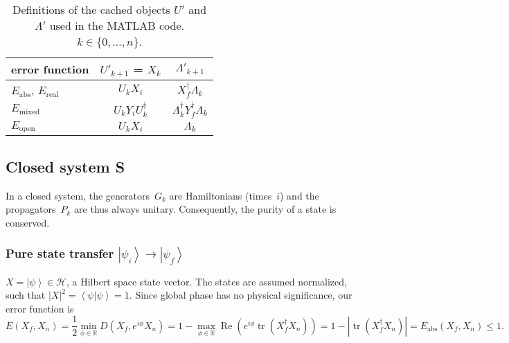 \documentclass[aps, pra, a4paper, longbibliography]{revtex4}
\newcommand{\be}{\begin{equation}}
\newcommand{\ee}{\end{equation}}
\newcommand{\R}{{\mathbb R}}  %
\newcommand{\ket}[1]{\left| #1 \right \rangle}
\newcommand{\bra}[1]{\left \langle #1 \right|}
\newcommand{\braket}[2]{\left \langle #1 | #2 \right \rangle}
\newcommand{\ketbra}[2]{\left| #1 \right \rangle \left \langle #2 \right|}
\newcommand{\hilb}[1]{\mathcal{#1}}
\DeclareMathOperator{\tr}{tr}
\DeclareMathOperator{\re}{Re}
\DeclareMathOperator{\cvec}{vec}
\begin{document}
\begin{table}
\begin{tabular}{l|c|c}
error function & $U'_{k+1}$ = $X_k$ & $\Lambda'_{k+1}$\\
\hline
$E_\text{abs}$, $E_\text{real}$ & $U_k X_i$ & $X_f^\dagger \Lambda_k$\\
$E_\text{mixed}$ & $U_k Y_i U_k^\dagger$ & $\Lambda_k^\dagger Y_f^\dagger \Lambda_k$\\
$E_\text{open}$ & $U_k X_i$ & $\Lambda_k$
\end{tabular}
\caption{Definitions of the cached objects $U'$ and $\Lambda'$ used in the MATLAB
  code. $k \in \{0, \ldots, n\}$.}
\label{table:UL}
\end{table}


\subsection{Closed system S}

In a closed system, the generators~$G_k$ are Hamiltonians (times~$i$)
and the propagators~$P_k$ are thus always
unitary. Consequently, the purity of a state is conserved.


\subsubsection{Pure state transfer $\ket{\psi_i} \to \ket{\psi_f}$}
\label{sec:closed-pure}

$X = \ket{\psi} \in \hilb{H}$, a Hilbert space state vector.
The states are assumed normalized, such that $|X|^2 = \braket{\psi}{\psi} = 1$.
Since global phase has no physical significance, our error function is
\be
E(X_f, X_n) = \frac{1}{2} \min_{\phi \in \R} D(X_f, e^{i \phi} X_n)
= 1 -\max_{\phi \in \R} \re \left( e^{i \phi} \tr(X_f^\dagger X_n)\right)
= 1 -|\tr(X_f^\dagger X_n)|
= E_\text{abs}(X_f, X_n) \le 1.
\ee

\begin{comment}
This result can also be obtained using the mixed state formula in the
vec representation, with $\rho = \ketbra{\psi}{\psi}$ and thus
$X = \cvec(\rho) = \ket{\psi^*} \otimes \ket{\psi}$.
The fidelity diagram breaks into two pieces and
we obtain
\be
f(X_f, X_n)
= (\re) \left|(\tr) \bra{\psi_f}  P_n \cdots P_1 \ket{\psi_i} \right|^2.
\ee
with $0 \le f(X_f, X_n) \le 1$.
Thus the problem simplifies back into Hilbert space
(albeit with an extra absolute value squared in the expression for the fidelity), and we may equivalently
choose $X = \ket{\psi}$.
\end{comment}
\end{document}
